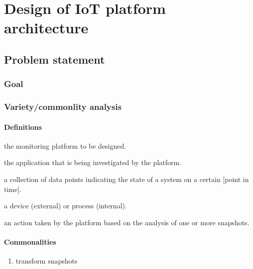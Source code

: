 \newcommand{\archid}{1}
\chapter{Design of IoT platform architecture}
\section{Problem statement}
\subsection{Goal}
\subsection{Variety/commonlity analysis}
\subsubsection{Definitions}
\begin{description}
\nospace
\item[Platform:] the monitoring platform to be designed.
\item[Application:] the application that is being investigated by the platform.
\item[Snapshot:] a collection of data points indicating the state of a system on a certain  [point in time].
\item[Source:] a device (external) or process (internal).
\item[Consequence:] an action taken by the platform based on the analysis of one or more snapshots.
\end{description}
\subsubsection{Commonalities}
\begin{enumerate}[label=C\archid .\arabic*]
\nospace
\item transform snapshots
\end{enumerate}
